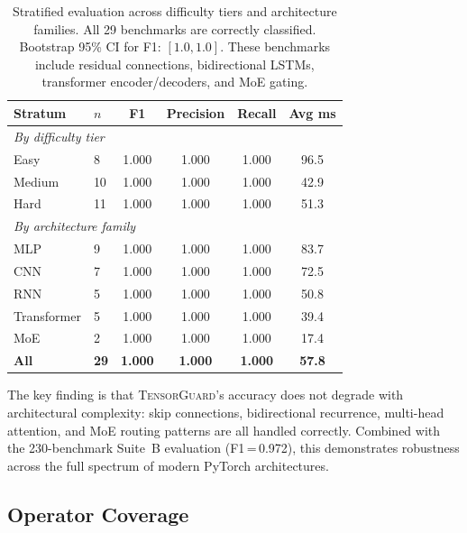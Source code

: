 \documentclass[11pt]{article}
\begin{document}
\begin{table}[h]
\centering\small
\begin{tabular}{llcccc}
\toprule
\textbf{Stratum} & \textbf{$n$} & \textbf{F1} & \textbf{Precision} & \textbf{Recall} & \textbf{Avg ms} \\
\midrule
\multicolumn{6}{l}{\emph{By difficulty tier}} \\
Easy         & 8  & 1.000 & 1.000 & 1.000 & 96.5  \\
Medium       & 10 & 1.000 & 1.000 & 1.000 & 42.9  \\
Hard         & 11 & 1.000 & 1.000 & 1.000 & 51.3  \\
\midrule
\multicolumn{6}{l}{\emph{By architecture family}} \\
MLP          & 9  & 1.000 & 1.000 & 1.000 & 83.7  \\
CNN          & 7  & 1.000 & 1.000 & 1.000 & 72.5  \\
RNN          & 5  & 1.000 & 1.000 & 1.000 & 50.8  \\
Transformer  & 5  & 1.000 & 1.000 & 1.000 & 39.4  \\
MoE          & 2  & 1.000 & 1.000 & 1.000 & 17.4  \\
\midrule
\textbf{All} & \textbf{29} & \textbf{1.000} & \textbf{1.000} & \textbf{1.000} & \textbf{57.8} \\
\bottomrule
\end{tabular}
\caption{Stratified evaluation across difficulty tiers and architecture
families.  All 29 benchmarks are correctly classified.  Bootstrap 95\% CI
for F1: $[1.0, 1.0]$.  These benchmarks include residual connections,
bidirectional LSTMs, transformer encoder/decoders, and MoE gating.}
\label{tab:stratified}
\end{table}

\noindent
The key finding is that \textsc{TensorGuard}'s accuracy does not degrade
with architectural complexity: skip connections, bidirectional recurrence,
multi-head attention, and MoE routing patterns are all handled correctly.
Combined with the 230-benchmark Suite~B evaluation (F1\,=\,0.972),
this demonstrates robustness across the full spectrum of modern
PyTorch architectures.

\subsection{Operator Coverage}
\end{document}
